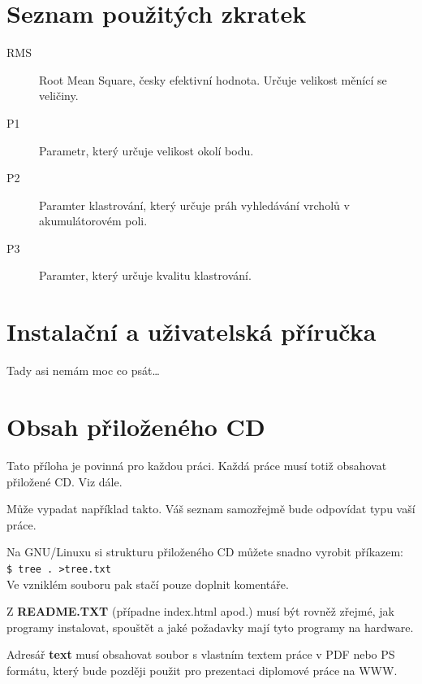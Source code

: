 \documentclass[11pt,twoside,a4paper]{book}
\begin{document}
\appendix

\chapter{Seznam použitých zkratek}
\label{chap:zkratky}

\begin{description}
\item[RMS] Root Mean Square, česky efektivní hodnota. Určuje velikost měnící se veličiny.
\item[P1] Parametr, který určuje velikost okolí bodu.
\item[P2] Paramter klastrování, který určuje práh vyhledávání vrcholů v akumulátorovém poli.
\item[P3] Paramter, který určuje kvalitu klastrování.
\end{description}


\chapter{Instalační a uživatelská příručka}
Tady asi nemám moc co psát\ldots


\chapter{Obsah přiloženého CD}
\label{chap:CD}
Tato příloha je povinná pro každou práci. Každá práce musí totiž obsahovat přiložené CD. Viz dále.

Může vypadat například takto. Váš seznam samozřejmě bude odpovídat typu vaší práce.


Na GNU/Linuxu si strukturu přiloženého CD můžete snadno vyrobit příkazem:\\ 
\verb|$ tree . >tree.txt|\\
Ve vzniklém souboru pak stačí pouze doplnit komentáře.

Z \textbf{README.TXT} (případne index.html apod.)  musí být rovněž zřejmé, jak programy instalovat, spouštět a
jaké požadavky mají tyto programy na hardware.

Adresář \textbf{text}  musí obsahovat soubor s vlastním textem práce v PDF nebo PS formátu, který bude později
použit pro prezentaci diplomové práce na WWW.
\end{document}
